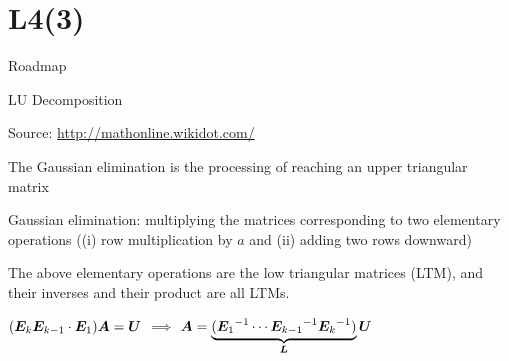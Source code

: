 \documentclass[fleqn,aspectratio=169]{beamer}
\begin{document}



\section{L4(3)}
\begin{frame}{Roadmap}

\plitemsep 0.1in

\bce[(1)] 
\item {}

\item {}

\item {}

\item {}

\ece
\end{frame}

\begin{frame}{LU Decomposition}

\plitemsep 0.05in



\vspace{-0.9cm}
\hfill{\scriptsize Source: \url{http://mathonline.wikidot.com/}}
    \vspace{-0.3cm}
\bci
\item The Gaussian elimination is the processing of reaching an upper triangular matrix
\item Gaussian elimination: multiplying the matrices corresponding to two elementary operations 
((i) row multiplication by $a$ and (ii) adding two rows downward)
\item The above elementary operations are the low triangular matrices (LTM), and their inverses and their product are all LTMs.

\item $(\bm{E}_k \bm{E}_{k-1}\cdot \bm{E}_1) \bm{A} = \bm{U}$ $\implies$ $\bm{A} = \underbrace{({{\bm{E}_1}^{-1}}\cdots {{\bm{E}_{k-1}}^{-1}} {{\bm{E}_{k}}^{-1}} )}_{\bm{L}}\bm{U}$
\eci
\end{frame}
\end{document}
